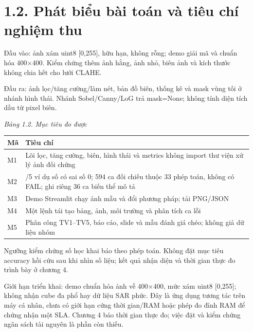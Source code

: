 \documentclass[12pt,a4paper]{extreport}
\begin{document}
\section*{1.2. Phát biểu bài toán và tiêu chí nghiệm thu}
Đầu vào: ảnh xám uint8 [0,\allowbreak{}255],\allowbreak{} hữu hạn,\allowbreak{} không rỗng; demo giải mã và chuẩn hóa 400\ensuremath{\times}400. Kiểm chứng thêm ảnh hằng,\allowbreak{} ảnh nhỏ,\allowbreak{} biên ảnh và kích thước không chia hết cho lưới CLAHE.
\par
Đầu ra: ảnh lọc/\allowbreak{}tăng cường/\allowbreak{}làm nét,\allowbreak{} bản đồ biên,\allowbreak{} thống kê và mask vùng tối ở nhánh hình thái. Nhánh Sobel/\allowbreak{}Canny/\allowbreak{}LoG trả mask=\allowbreak{}None; không tính diện tích dầu từ pixel biên.
\par
{\fontsize{10.5}{12}\selectfont\textit{Bảng 1.2. Mục tiêu đo được}
\begin{longtable}{>{\raggedright\arraybackslash}p{7.693cm}|>{\raggedright\arraybackslash}p{7.693cm}}
\textbf{Mã} & \textbf{Tiêu chí}\\\hline
\endhead
M1 & Lõi lọc,\allowbreak{} tăng cường,\allowbreak{} biên,\allowbreak{} hình thái và metrics không import thư viện xử lý ảnh đối chứng\\\hline
M2 & 5/\allowbreak{}5 ví dụ số có sai số 0; 594 ca đối chiếu thuộc 33 phép toán,\allowbreak{} không có FAIL; ghi riêng 36 ca biến thể mô tả\\\hline
M3 & Demo Streamlit chạy ảnh mẫu và đổi phương pháp; tải PNG/\allowbreak{}JSON\\\hline
M4 & Một lệnh tái tạo bảng,\allowbreak{} ảnh,\allowbreak{} môi trường và phân tích ca lỗi\\\hline
M5 & Phân công TV1–TV5,\allowbreak{} báo cáo,\allowbreak{} slide và mẫu đánh giá chéo; không giả dữ liệu nhóm\\\hline
\end{longtable}}
Ngưỡng kiểm chứng số học khai báo theo phép toán. Không đặt mục tiêu accuracy hồi cứu sau khi nhìn số liệu; kết quả nhận diện và thời gian thực đo trình bày ở chương 4.
\par
Giới hạn triển khai: demo chuẩn hóa ảnh về 400\ensuremath{\times}400,\allowbreak{} mức xám uint8 [0,\allowbreak{}255]; không nhận cube đa phổ hay dữ liệu SAR phức. Đây là ứng dụng tương tác trên máy cá nhân,\allowbreak{} chưa có giới hạn cứng thời gian/\allowbreak{}RAM hoặc phép đo đỉnh RAM để chứng nhận một SLA. Chương 4 báo thời gian thực đo; việc đặt và kiểm chứng ngân sách tài nguyên là phần còn thiếu.
\par
\end{document}
